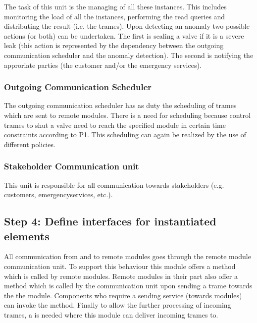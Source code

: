 \npar The task of this unit is the managing of all these instances. This
includes monitoring the load of all the instances, performing the read queries
and distributing the result (i.e. the trames). Upon detecting an anomaly two
possible actions (or both) can be undertaken. The first is sealing a valve if
it is a severe leak (this action is represented by the dependency between the
outgoing communication scheduler and the anomaly detection). The second is
notifying the approriate parties (the customer and/or the emergency services).

\subsubsection{Outgoing Communication Scheduler}

\npar The outgoing communication scheduler has as duty the scheduling of
trames which are sent to remote modules. There is a need for scheduling because
control trames to shut a valve need to reach the specified module in certain
time constraints according to P1. This scheduling can again be realized by the
use of different policies.

\subsubsection{Stakeholder Communication unit}

\npar This unit is responsible for all communication towards stakeholders (e.g.
customers, emergencyservices, etc.). 

\subsection{Step 4: Define interfaces for instantiated elements}
\label{add:it1/interfaces}

\npar All communication from and to remote modules goes through the remote
module communication unit. To support this behaviour this module offers a
 method which is called by remote modules. Remote
modules in their part also offer a  method which is called
by the communication unit upon sending a trame towards the the module. Components
who require a sending service (towards modules) can invoke the
 method. Finally to allow the further processing of
incoming trames, a  is needed where this
module can deliver incoming trames to.

